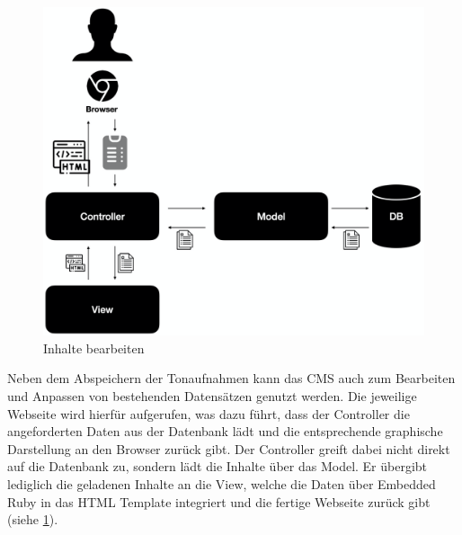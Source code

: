 \begin{figure}
	\centering
	\includegraphics[width=0.5\linewidth]{Assets/PluraPolit-Softwaresystem.004}
	\caption{Inhalte bearbeiten}
	\label{fig:plurapolit-edit}
\end{figure}

Neben dem Abspeichern der Tonaufnahmen kann das CMS auch zum Bearbeiten und Anpassen von bestehenden Datensätzen genutzt werden. Die jeweilige Webseite wird hierfür aufgerufen, was dazu führt, dass der Controller die angeforderten Daten aus der Datenbank lädt und die entsprechende graphische Darstellung an den Browser zurück gibt. Der Controller greift dabei nicht direkt auf die Datenbank zu, sondern lädt die Inhalte über das Model. Er übergibt lediglich die geladenen Inhalte an die View, welche die Daten über Embedded Ruby in das HTML Template integriert und die fertige Webseite zurück gibt (siehe \cref{fig:plurapolit-edit}).

